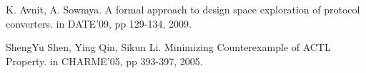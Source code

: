 \documentclass[journal]{IEEEtran}
\begin{document}
\begin{thebibliography}{1}
K. Avnit, A. Sowmya.
A formal approach to design space exploration of protocol converters.
in DATE'09,
pp 129-134,
2009.


ShengYu Shen, Ying Qin, Sikun Li.
Minimizing Counterexample of ACTL Property.
in CHARME'05,
pp 393-397,
2005.

\end{thebibliography}

%










\end{document}
